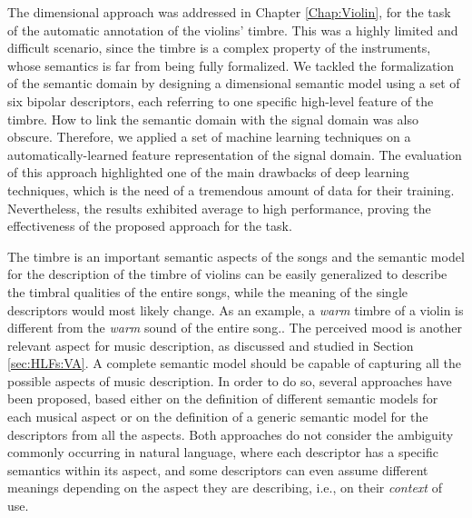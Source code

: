The dimensional approach was addressed in Chapter \ref{Chap:Violin}, for the task of the automatic annotation of the violins' timbre. This was a highly limited and difficult scenario, since the timbre is a complex property of the instruments, whose semantics is far from being fully formalized. We tackled the formalization of the semantic domain by designing a dimensional semantic model using a set of six bipolar descriptors, each referring to one specific high-level feature of the timbre. How to link the semantic domain with the signal domain was also obscure. Therefore, we applied a set of machine learning techniques on a automatically-learned feature representation of the signal domain. The evaluation of this approach highlighted one of the main drawbacks of deep learning techniques, which is the need of a tremendous amount of data for their training. Nevertheless, the results exhibited average to high performance, proving the effectiveness of the proposed approach for the task.

The timbre is an important semantic aspects of the songs and the semantic model for the description of the timbre of violins can be easily generalized to describe the timbral qualities of the entire songs, while the meaning of the single descriptors would most likely change. As an example, a \textit{warm} timbre of a violin is different from the \textit{warm} sound of the entire song.. The perceived mood is another relevant aspect for music description, as discussed and studied in Section \ref{sec:HLFs:VA}. A complete semantic model should be capable of capturing all the possible aspects of music description. In order to do so, several approaches have been proposed, based either on the definition of different semantic models for each musical aspect or on the definition of a generic semantic model for the descriptors from all the aspects. Both approaches do not consider the ambiguity commonly occurring in natural language, where each descriptor has a specific semantics within its aspect, and some descriptors can even assume different meanings depending on the aspect they are describing, i.e., on their \textit{context} of use.

